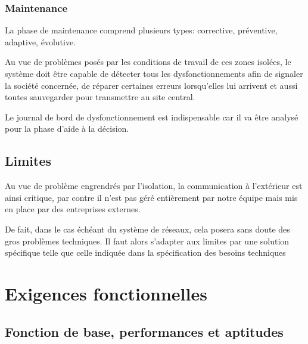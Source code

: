 \subsubsection{Maintenance}
La phase de maintenance comprend plusieurs types: corrective, préventive, adaptive, évolutive.  

Au vue de problèmes posés par les conditions de travail de ces zones isolées, le système doit être capable de détecter tous les dysfonctionnements afin de signaler la société concernée, de réparer certaines erreurs lorsqu’elles lui arrivent et aussi toutes sauvegarder pour transmettre au site central. 

Le journal de bord de dysfonctionnement est indispensable car il va être analysé pour la phase d’aide à la décision.
             
\subsection{Limites}
Au vue de problème engrendrés par l'isolation, la communication à l'extérieur est ainsi critique, par contre il n'est  pas géré entièrement par notre équipe mais mis en place par des entreprises externes. 

De fait, dans le cas échéant du système de réseaux, cela posera sans doute des gros problèmes techniques. Il faut alors s'adapter aux limites par une solution spécifique telle que celle indiquée dans la spécification des besoins techniques    
        
\section{Exigences fonctionnelles}

    \subsection{Fonction de base, performances et aptitudes}

